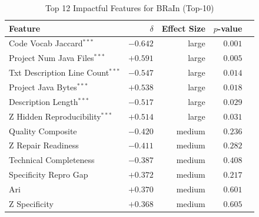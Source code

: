 
\begin{table}[h]
\centering
\caption{Top 12 Impactful Features for BRaIn (Top-10)}
\label{tab:tool_features_brain_top10}
\begin{tabular}{lrrrr}
\toprule
Feature & $\delta$ & Effect Size & $p$-value \\
\midrule
Code Vocab Jaccard$^{***}$ & $-0.642$ & large & $0.001$ \\
Project Num Java Files$^{***}$ & $+0.591$ & large & $0.005$ \\
Txt Description Line Count$^{***}$ & $-0.547$ & large & $0.014$ \\
Project Java Bytes$^{***}$ & $+0.538$ & large & $0.018$ \\
Description Length$^{***}$ & $-0.517$ & large & $0.029$ \\
Z Hidden Reproducibility$^{***}$ & $+0.514$ & large & $0.031$ \\
Quality Composite & $-0.420$ & medium & $0.236$ \\
Z Repair Readiness & $-0.411$ & medium & $0.282$ \\
Technical Completeness & $-0.387$ & medium & $0.408$ \\
Specificity Repro Gap & $+0.372$ & medium & $0.217$ \\
Ari & $+0.370$ & medium & $0.601$ \\
Z Specificity & $+0.368$ & medium & $0.605$ \\
\bottomrule
\end{tabular}
\end{table}


